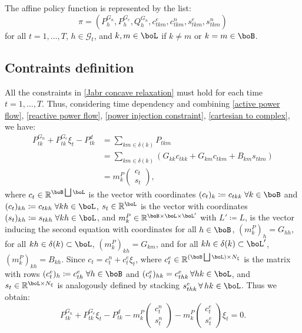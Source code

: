 \documentclass[11pt,a4paper,oneside,openany]{book}
\numberwithin{definition}{section}
\numberwithin{theorem}{section}
\numberwithin{problem}{section}
\begin{document}
The affine policy function is represented by the list:
\[
\pi = (P^{G_n}_h ,P^{G_e}_h ,Q^{G_n}_h ,c^e_{tkm} ,c^n_{tkm},s^e_{tkm} ,s^n_{tkm})\] for all $t = 1, \ldots, T$,
$h \in \mathcal{G}_t$, and ${k,m} \in \boL$ if $k \neq m$ or $k = m \in \boB$.

\subsection{Contraints definition}

All the constraints in \eqref{Jabr concave relaxation} must hold for each time $t = 1,\ldots, T$. Thus, considering time dependency and combining \eqref{active power flow}, \eqref{reactive power flow}, \eqref{power injection constraint}, \eqref{cartesian to complex}, we have:
\begin{align}
P_{tk}^{G_n}+P_{tk}^{G_e}\xi_t - P^d_{tk} &= \sum_{km \in \delta(k)} P_{tkm} \nonumber \\
&=  \sum_{km \in \delta(k)} (G_{kk}c_{tkk} + G_{km}c_{tkm} + B_{km}s_{tkm}) \nonumber \\
&=  m_k^P \begin{pmatrix} c_t \\ s_t\end{pmatrix},
\end{align}
where $c_t \in \mathbb{R}^{\boB \bigsqcup \boL}$ is the vector with coordinates $(c_t)_k \coloneqq c_{tkk} \; \forall k \in \boB$ and $(c_{t})_{kh} \coloneqq c_{tkh} \; \forall kh \in \boL$, $s_t \in \mathbb{R}^{\boL}$ is the vector with coordinates $(s_{t})_{kh} \coloneqq s_{tkh} \; \forall kh \in \boL$, and $m_k^P \in \mathbb{R}^{\boB \times \boL \times \boL'}$ with $L' \coloneqq L$, is the vector inducing the second equation with coordinates for all $h \in \boB$, $(m_k^P)_h = G_{hh}$, for all $kh \in \delta(k) \subset \boL$, $(m_k^P)_{kh} = G_{km}$, and for all $kh \in \delta(k) \subset \boL'$, $(m_k^P)_{kh} = B_{kh}$. Since $c_t = c_t^n + c_t^e \xi_t$, where $c_t^e \in \mathbb{R}^{(\boB \bigsqcup \boL) \times N_{\xi}}$ is the matrix with rows $(c_t^e)_h \coloneqq c_{th}^e \; \forall h \in \boB$ and $(c_t^e)_{hk} = c_{thk}^e \, \forall hk \in \boL$, and $s_t \in \mathbb{R}^{\boL \times N_{\xi}}$ is analogously defined by stacking $s_{thk}^e \, \forall \, hk \in \boL$. Thus we obtain:
\begin{equation*}
    P_{tk}^{G_n}+P_{tk}^{G_e}\xi_t - P^d_{tk} - m_k^P  \begin{pmatrix} c_t^n \\ s_t^n \end{pmatrix} - m_k^P  \begin{pmatrix} c_t^e \\ s_t^e\end{pmatrix}\xi_t = 0.
\end{equation*}
\end{document}
